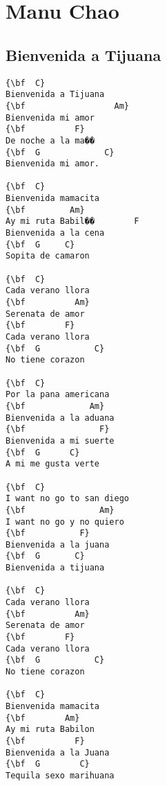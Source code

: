 \documentclass[a4paper]{article}
\begin{document}
\section{Manu Chao}
\subsection{Bienvenida a Tijuana}
\begin{multicols}{2}\begin{Verbatim}[commandchars=\\\{\}]
{\bf  C}
Bienvenida a Tijuana
{\bf                  Am}
Bienvenida mi amor
{\bf  		  F}
De noche a la ma��
{\bf  G             C}
Bienvenida mi amor. 

{\bf  C}
Bienvenida mamacita
{\bf  		 Am}
Ay mi ruta Babil��		  F
Bienvenida a la cena 
{\bf  G		C}
Sopita de camaron

{\bf  C}
Cada verano llora
{\bf  	      Am}
Serenata de amor
{\bf  		F}
Cada verano llora
{\bf  G           C}
No tiene corazon

{\bf  C}
Por la pana americana
{\bf  		     Am}
Bienvenida a la aduana
{\bf  		       F}
Bienvenida a mi suerte 
{\bf  G		 C}
A mi me gusta verte

{\bf  C}
I want no go to san diego
{\bf  		       Am}
I want no go y no quiero
{\bf  		   F}
Bienvenida a la juana 
{\bf  G		  C}
Bienvenida a tijuana

{\bf  C}
Cada verano llora
{\bf  	      Am}
Serenata de amor
{\bf  		F}
Cada verano llora
{\bf  G           C}
No tiene corazon

{\bf  C}
Bienvenida mamacita
{\bf  		Am}
Ay mi ruta Babilon
{\bf  		  F}
Bienvenida a la Juana 
{\bf  G		   C}
Tequila sexo marihuana

\end{Verbatim}
\end{multicols}\newpage
\end{document}
